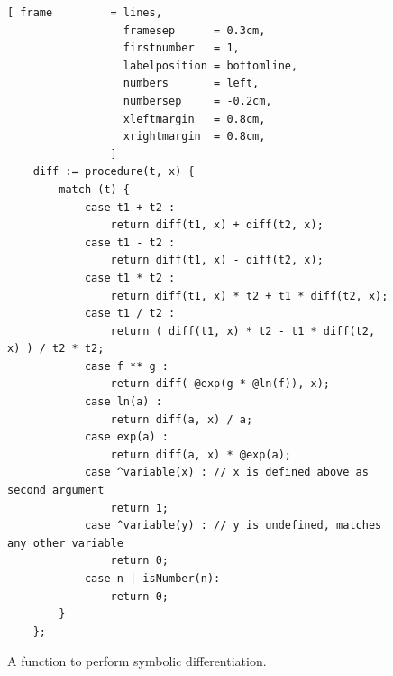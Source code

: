 \documentclass[11pt]{report}
\begin{document}
\begin{figure}[!ht]
\centering
\begin{Verbatim}[ frame         = lines, 
                  framesep      = 0.3cm, 
                  firstnumber   = 1,
                  labelposition = bottomline,
                  numbers       = left,
                  numbersep     = -0.2cm,
                  xleftmargin   = 0.8cm,
                  xrightmargin  = 0.8cm,
                ]
    diff := procedure(t, x) {
        match (t) {
            case t1 + t2 :
                return diff(t1, x) + diff(t2, x);
            case t1 - t2 :
                return diff(t1, x) - diff(t2, x);
            case t1 * t2 :
                return diff(t1, x) * t2 + t1 * diff(t2, x);
            case t1 / t2 :
                return ( diff(t1, x) * t2 - t1 * diff(t2, x) ) / t2 * t2;
            case f ** g :
                return diff( @exp(g * @ln(f)), x);
            case ln(a) :
                return diff(a, x) / a;
            case exp(a) :
                return diff(a, x) * @exp(a);
            case ^variable(x) : // x is defined above as second argument
                return 1;
            case ^variable(y) : // y is undefined, matches any other variable
                return 0;
            case n | isNumber(n):   
                return 0;  
        }
    };
\end{Verbatim}
\vspace*{-0.3cm}
\caption{A function to perform symbolic differentiation.}
\label{fig:diff.stlx}
\end{figure}
\end{document}
